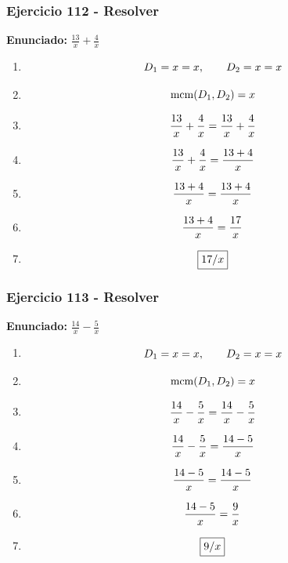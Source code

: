 \documentclass[11pt,a4paper]{article}
\newcommand{\fitmath}[1]{%
\[
\setbox0=\hbox{$\displaystyle #1$}%
\ifdim\wd0>\linewidth
\resizebox{\linewidth}{!}{$\displaystyle #1$}%
\else
#1%
\fi
\]
}
\begin{document}
\vspace{0.12cm}
\subsubsection*{Ejercicio 112 - Resolver}
\textbf{Enunciado:} $ \frac{13}{x} + \frac{4}{x} $\par
\begin{enumerate}[leftmargin=2em]
\item \fitmath{D_1=x=x,\qquad D_2=x=x}
\item \fitmath{\operatorname{mcm}(D_1,D_2)=x}
\item \fitmath{\frac{13}{x} + \frac{4}{x}= \frac{13}{x} + \frac{4}{x}}
\item \fitmath{\frac{13}{x} + \frac{4}{x}=\frac{13 + 4}{x}}
\item \fitmath{\frac{13 + 4}{x}=\frac{13 + 4}{x}}
\item \fitmath{\frac{13 + 4}{x}=\frac{17}{x}}
\item \fitmath{\boxed{17 / x}}
\end{enumerate}

\vspace{0.12cm}
\subsubsection*{Ejercicio 113 - Resolver}
\textbf{Enunciado:} $ \frac{14}{x} - \frac{5}{x} $\par
\begin{enumerate}[leftmargin=2em]
\item \fitmath{D_1=x=x,\qquad D_2=x=x}
\item \fitmath{\operatorname{mcm}(D_1,D_2)=x}
\item \fitmath{\frac{14}{x} - \frac{5}{x}= \frac{14}{x} - \frac{5}{x}}
\item \fitmath{\frac{14}{x} - \frac{5}{x}=\frac{14 - 5}{x}}
\item \fitmath{\frac{14 - 5}{x}=\frac{14 - 5}{x}}
\item \fitmath{\frac{14 - 5}{x}=\frac{9}{x}}
\item \fitmath{\boxed{9 / x}}
\end{enumerate}

\vspace{0.12cm}
\end{document}
